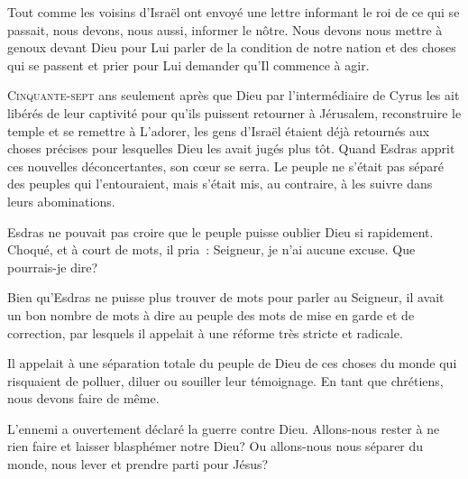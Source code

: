 Tout comme les voisins d'Israël ont envoyé une lettre informant
 le roi de ce qui se passait, nous devons, nous aussi, informer le nôtre.
 Nous devons nous mettre à genoux devant Dieu pour Lui parler de la condition
 de notre nation et des choses qui se passent \ocadr{}et prier pour Lui demander
 qu'Il commence à agir. 

\dvrule







\lettrine{C}{inquante-sept} ans seulement après que Dieu
 \ocadr{}par l'intermédiaire de Cyrus\fcadr{} les ait libérés de leur captivité
 pour qu'ils puissent retourner à Jérusalem,
 reconstruire le temple et se remettre à L'adorer,
 les gens d'Israël étaient déjà retournés aux choses précises
 pour lesquelles Dieu les avait jugés plus tôt.
 Quand Esdras apprit ces nouvelles déconcertantes, son c\oe{}ur se serra.
 Le peuple ne s'était pas séparé des peuples qui l'entouraient,
 mais s'était mis, au contraire, à les suivre dans leurs abominations.

Esdras ne pouvait pas croire que le peuple puisse oublier Dieu si rapidement.
 Choqué, et à court de mots, il pria~: \Og Seigneur, je n'ai aucune excuse.
 Que pourrais-je dire? \Fg{}

Bien qu'Esdras ne puisse plus trouver de mots pour parler au Seigneur,
 il avait un bon nombre de mots à dire au peuple \ocadr{}des mots de mise en garde
 et de correction, par lesquels il appelait à une réforme très stricte
 et radicale.

Il appelait à une séparation totale du peuple de Dieu de ces choses du monde
 qui risquaient de polluer, diluer ou souiller leur témoignage.
 En tant que chrétiens, nous devons faire de même. 



L'ennemi a ouvertement déclaré la guerre contre Dieu.
 Allons-nous rester à ne rien faire et laisser blasphémer notre Dieu?
 Ou allons-nous nous séparer du monde, nous lever et prendre parti pour Jésus? 

